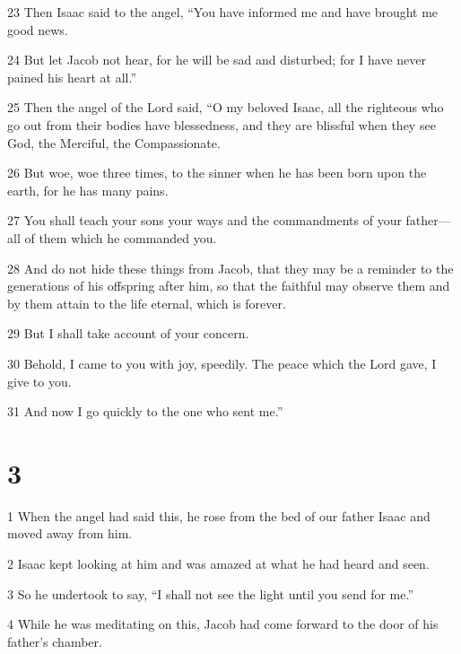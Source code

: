 \par 23 Then Isaac said to the angel, “You have informed me and have brought me good news. 

\par 24 But let Jacob not hear, for he will be sad and disturbed; for I have never pained his heart at all.” 

\par 25 Then the angel of the Lord said, “O my beloved Isaac, all the righteous who go out from their bodies have blessedness, and they are blissful when they see God, the Merciful, the Compassionate. 

\par 26 But woe, woe three times, to the sinner when he has been born upon the earth, for he has many pains. 

\par 27 You shall teach your sons your ways and the commandments of your father—all of them which he commanded you. 

\par 28 And do not hide these things from Jacob, that they may be a reminder to the generations of his offspring after him, so that the faithful may observe them and by them attain to the life eternal, which is forever. 

\par 29 But I shall take account of your concern. 

\par 30 Behold, I came to you with joy, speedily. The peace which the Lord gave, I give to you. 

\par 31 And now I go quickly to the one who sent me.” 

\chapter{3}

\par 1 When the angel had said this, he rose from the bed of our father Isaac and moved away from him. 

\par 2 Isaac kept looking at him and was amazed at what he had heard and seen. 

\par 3 So he undertook to say, “I shall not see the light until you send for me.” 

\par 4 While he was meditating on this, Jacob had come forward to the door of his father’s chamber. 

